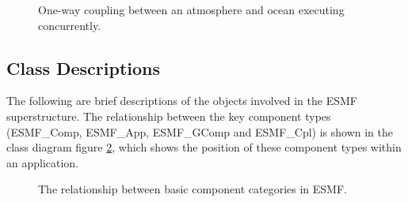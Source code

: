\begin{figure}
\caption[{Coupling Sequence}]{One-way coupling between an atmosphere and
ocean executing concurrently.}
\label{fig:1waycoupling}
\end{figure}

\subsection{Class Descriptions}

The following are brief descriptions of the objects involved in the
ESMF superstructure. The relationship between the key component types (ESMF\_Comp, ESMF\_App, ESMF\_GComp and ESMF\_Cpl)
is shown in the 
class diagram figure \ref{fig:ESMFComponentDiagram}, which shows the position of these component 
types within an application.

\begin{figure}
\caption[{Component Classes}]{The relationship between basic component categories in ESMF.} 
\label{fig:ESMFComponentDiagram}
\end{figure}

